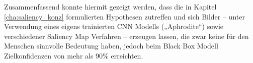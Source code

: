 

Zusammenfassend konnte hiermit gezeigt werden, dass die in Kapitel \ref{cha:saliency_konz} formulierten Hypothesen zutreffen und sich Bilder – unter Verwendung eines eigens trainierten \ac{CNN} Modells („Aphrodite“) sowie verschiedener Saliency Map Verfahren – erzeugen lassen, die zwar keine für den Menschen sinnvolle Bedeutung haben, jedoch beim Black Box Modell Zielkonfidenzen von mehr als 90\% erreichten.


